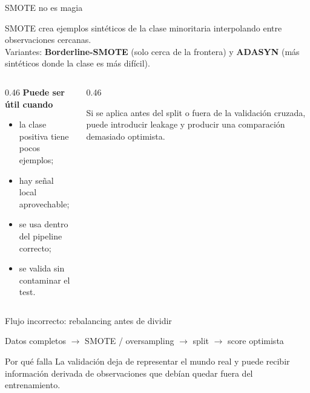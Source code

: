 \documentclass[aspectratio=169,12pt]{beamer}
\newcommand{\colhead}[1]{\textbf{#1}\par\vspace{2pt}}
\begin{document}
\begin{frame}{SMOTE no es magia}
  \begin{center}
    \large SMOTE crea ejemplos sintéticos de la clase minoritaria interpolando entre observaciones cercanas.\\[2pt]
    \footnotesize Variantes: \textbf{Borderline-SMOTE} (solo cerca de la frontera) y \textbf{ADASYN} (más sintéticos donde la clase es más difícil).
  \end{center}
  \begin{columns}[T]
    \begin{column}{0.46\textwidth}
      \colhead{Puede ser útil cuando}
      \begin{itemize}
        \item la clase positiva tiene pocos ejemplos;
        \item hay señal local aprovechable;
        \item se usa dentro del pipeline correcto;
        \item se valida sin contaminar el test.
      \end{itemize}
    \end{column}
    \begin{column}{0.46\textwidth}
      \begin{rulebox}
        Si se aplica antes del split o fuera de la validación cruzada, puede introducir leakage y producir una comparación demasiado optimista.
      \end{rulebox}
    \end{column}
  \end{columns}
\end{frame}

\begin{frame}{Flujo incorrecto: rebalancing antes de dividir}
  \begin{center}
    \large Datos completos $\rightarrow$ SMOTE / oversampling $\rightarrow$ split $\rightarrow$ score optimista
  \end{center}
  \vspace{6pt}
  \begin{alertblock}{{\large Por qué falla}}
    \large La validación deja de representar el mundo real y puede recibir información derivada de observaciones que debían quedar fuera del entrenamiento.
  \end{alertblock}
\end{frame}
\end{document}
